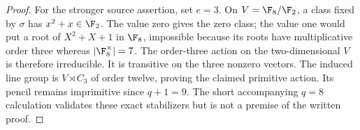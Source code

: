 \begin{proof}
For the stronger source assertion, set $e=3$. On $V=\F_8/\F_2$, a class
fixed by $\sigma$ has $x^2+x\in\F_2$. The value zero gives the zero class;
the value one would put a root of $X^2+X+1$ in $\F_8$, impossible because
its roots have multiplicative order three whereas $|\F_8^\times|=7$.
The order-three action on the two-dimensional $V$ is therefore irreducible.
It is transitive on the three nonzero vectors. The induced line group is
$V\rtimes C_3$ of order twelve, proving the claimed primitive action.
Its pencil remains imprimitive since $q+1=9$. The short accompanying
$q=8$ calculation validates these exact stabilizers but is not a premise
of the written proof.
\end{proof}
